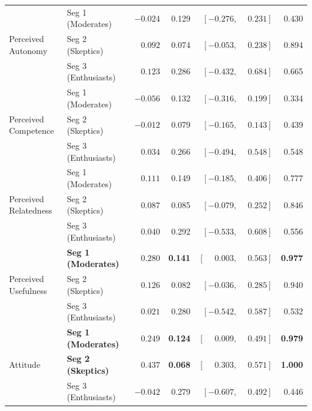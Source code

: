 \documentclass[11pt]{article}
\begin{document}
\begin{table}[H]
\begin{tabular}{l l r r r r}
    \midrule
    \multirow{3}{*}{Perceived Autonomy}
      & Seg 1 (Moderates)   & $-0.024$           & 0.129 & $[-0.276, \phantom{-}0.231]$ & 0.430 \\
      & Seg 2 (Skeptics)    & $\phantom{-}0.092$ & 0.074 & $[-0.053, \phantom{-}0.238]$ & 0.894 \\
      & Seg 3 (Enthusiasts) & $\phantom{-}0.123$ & 0.286 & $[-0.432, \phantom{-}0.684]$ & 0.665 \\
    \midrule
    \multirow{3}{*}{Perceived Competence}
      & Seg 1 (Moderates)   & $-0.056$           & 0.132 & $[-0.316, \phantom{-}0.199]$ & 0.334 \\
      & Seg 2 (Skeptics)    & $-0.012$           & 0.079 & $[-0.165, \phantom{-}0.143]$ & 0.439 \\
      & Seg 3 (Enthusiasts) & $\phantom{-}0.034$ & 0.266 & $[-0.494, \phantom{-}0.548]$ & 0.548 \\
    \midrule
    \multirow{3}{*}{Perceived Relatedness}
      & Seg 1 (Moderates)   & $\phantom{-}0.111$ & 0.149 & $[-0.185, \phantom{-}0.406]$ & 0.777 \\
      & Seg 2 (Skeptics)    & $\phantom{-}0.087$ & 0.085 & $[-0.079, \phantom{-}0.252]$ & 0.846 \\
      & Seg 3 (Enthusiasts) & $\phantom{-}0.040$ & 0.292 & $[-0.533, \phantom{-}0.608]$ & 0.556 \\
    \midrule
    \multirow{3}{*}{Perceived Usefulness}
      & \textbf{Seg 1 (Moderates)}   & $\mathbf{\phantom{-}0.280}$ & \textbf{0.141} & $\mathbf{[\phantom{-}0.003, \phantom{-}0.563]}$ & \textbf{0.977} \\
      & Seg 2 (Skeptics)             & $\phantom{-}0.126$          & 0.082          & $[-0.036, \phantom{-}0.285]$                    & 0.940 \\
      & Seg 3 (Enthusiasts)          & $\phantom{-}0.021$          & 0.280          & $[-0.542, \phantom{-}0.587]$                    & 0.532 \\
    \midrule
    \multirow{3}{*}{Attitude}
      & \textbf{Seg 1 (Moderates)}   & $\mathbf{\phantom{-}0.249}$ & \textbf{0.124} & $\mathbf{[\phantom{-}0.009, \phantom{-}0.491]}$ & \textbf{0.979} \\
      & \textbf{Seg 2 (Skeptics)}    & $\mathbf{\phantom{-}0.437}$ & \textbf{0.068} & $\mathbf{[\phantom{-}0.303, \phantom{-}0.571]}$ & \textbf{1.000} \\
      & Seg 3 (Enthusiasts)          & $-0.042$                    & 0.279          & $[-0.607, \phantom{-}0.492]$                    & 0.446 \\
    \bottomrule
  \end{tabular}
\end{table}
\end{document}
